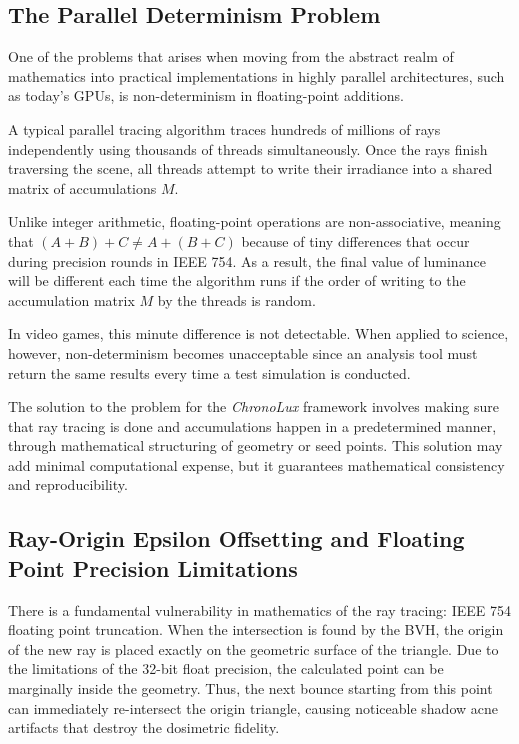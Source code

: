 \subsection{The Parallel Determinism Problem}\label{sec:parallel_determinism}
One of the problems that arises when moving from the abstract realm of mathematics into practical implementations in highly parallel architectures, such as today's GPUs, is non-determinism in floating-point additions.

A typical parallel tracing algorithm traces hundreds of millions of rays independently using thousands of threads simultaneously. Once the rays finish traversing the scene, all threads attempt to write their irradiance into a shared matrix of accumulations $M$.

Unlike integer arithmetic, floating-point operations are non-associative, meaning that $(A + B) + C \neq A + (B + C)$ because of tiny differences that occur during precision rounds in IEEE 754. As a result, the final value of luminance will be different each time the algorithm runs if the order of writing to the accumulation matrix $M$ by the threads is random.

In video games, this minute difference is not detectable. When applied to science, however, non-determinism becomes unacceptable since an analysis tool must return the same results every time a test simulation is conducted.

The solution to the problem for the \textit{ChronoLux} framework involves making sure that ray tracing is done and accumulations happen in a predetermined manner, through mathematical structuring of geometry or seed points. This solution may add minimal computational expense, but it guarantees mathematical consistency and reproducibility.

\subsection{Ray-Origin Epsilon Offsetting and Floating Point Precision Limitations}

There is a fundamental vulnerability in mathematics of the ray tracing: IEEE 754 floating point truncation. When the intersection is found by the BVH, the origin of the new ray is placed exactly on the geometric surface of the triangle. Due to the limitations of the 32-bit float precision, the calculated point can be marginally inside the geometry. Thus, the next bounce starting from this point can immediately re-intersect the origin triangle, causing noticeable shadow acne artifacts that destroy the dosimetric fidelity.

